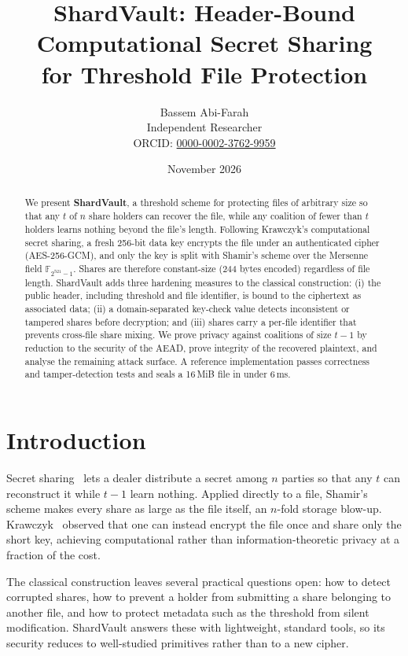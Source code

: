 \documentclass[11pt]{article}
\title{\textbf{ShardVault}: Header-Bound Computational Secret Sharing\\for Threshold File Protection}
\author{Bassem Abi-Farah\\Independent Researcher\\ORCID: \href{https://orcid.org/0000-0002-3762-9959}{0000-0002-3762-9959}}
\date{November 2026}
\theoremstyle{definition}
\begin{document}
\maketitle

\begin{abstract}
We present \textbf{ShardVault}, a threshold scheme for protecting files of arbitrary size so that any $t$ of $n$ share holders can recover the file, while any coalition of fewer than $t$ holders learns nothing beyond the file's length. Following Krawczyk's computational secret sharing, a fresh 256-bit data key encrypts the file under an authenticated cipher (AES-256-GCM), and only the key is split with Shamir's scheme over the Mersenne field $\mathbb{F}_{2^{521}-1}$. Shares are therefore constant-size (244 bytes encoded) regardless of file length. ShardVault adds three hardening measures to the classical construction: (i) the public header, including threshold and file identifier, is bound to the ciphertext as associated data; (ii) a domain-separated key-check value detects inconsistent or tampered shares before decryption; and (iii) shares carry a per-file identifier that prevents cross-file share mixing. We prove privacy against coalitions of size $t-1$ by reduction to the security of the AEAD, prove integrity of the recovered plaintext, and analyse the remaining attack surface. A reference implementation passes correctness and tamper-detection tests and seals a 16\,MiB file in under 6\,ms.
\end{abstract}

\section{Introduction}
Secret sharing~\cite{shamir1979} lets a dealer distribute a secret among $n$ parties so that any $t$ can reconstruct it while $t-1$ learn nothing. Applied directly to a file, Shamir's scheme makes every share as large as the file itself, an $n$-fold storage blow-up. Krawczyk~\cite{krawczyk1993} observed that one can instead encrypt the file once and share only the short key, achieving computational rather than information-theoretic privacy at a fraction of the cost.

The classical construction leaves several practical questions open: how to detect corrupted shares, how to prevent a holder from submitting a share belonging to another file, and how to protect metadata such as the threshold from silent modification. ShardVault answers these with lightweight, standard tools, so its security reduces to well-studied primitives rather than to a new cipher.
\end{document}
